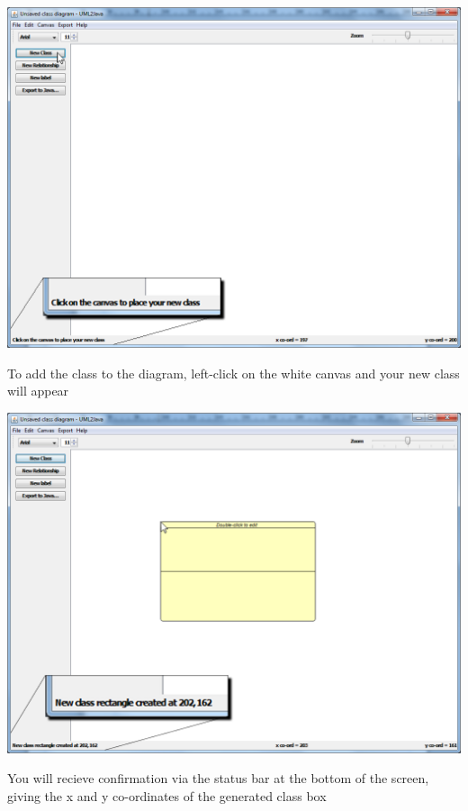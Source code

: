 \documentclass[a4paper]{article}
\begin{document}
\begin{center}\includegraphics[trim = 0pt 0pt 500pt 675pt, clip, scale=0.7]{./images/addnewclass2.png} \end{center}
To add the class to the diagram, left-click on the white canvas and your new class will appear
\begin{center}\includegraphics[scale=0.3]{./images/addnewclass3.png} \end{center}
You will recieve confirmation via the status bar at the bottom of the screen, giving the x and y co-ordinates of the generated class box
\end{document}
